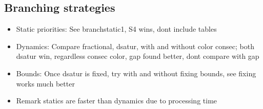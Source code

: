 
\subsection{Branching strategies}
\label{subsec:resultsbranching}

\begin{itemize}
\item Static priorities: See branchstatic1, S4 wins, dont include tables
\item Dynamics: Compare fractional, dsatur, with and without color consec; both dsatur win, regardless consec color, gap found better, dont compare with gap
\item Bounds: Once dsatur is fixed, try with and without fixing bounds, see fixing works much better
\item Remark statics are faster than dynamics due to processing time
\end{itemize}